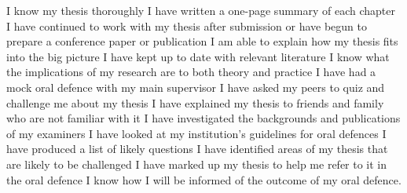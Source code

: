 
I know my thesis thoroughly
I have written a one-page summary of each chapter
I have continued to work with my thesis after submission or have begun to prepare a conference paper or publication
I am able to explain how my thesis fits into the big picture
I have kept up to date with relevant literature
I know what the implications of my research are to both theory and practice
I have had a mock oral defence with my main supervisor
I have asked my peers to quiz and challenge me about my thesis
I have explained my thesis to friends and family who are not familiar with it
I have investigated the backgrounds and publications of my examiners
I have looked at my institution's guidelines for oral defences
I have produced a list of likely questions
I have identified areas of my thesis that are likely to be challenged
I have marked up my thesis to help me refer to it in the oral defence
I know how I will be informed of the outcome of my oral defence.